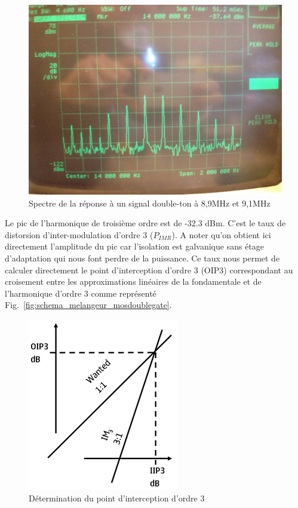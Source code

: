 \documentclass{article}
\begin{document}
\begin{figure}[h!]
	\centering
	\includegraphics[width=.7\textwidth]{9_3_4}
	\caption{Spectre de la réponse à un signal double-ton à 8,9MHz et 9,1MHz}
	\label{fig:9_3_4}
\end{figure}
Le pic de l'harmonique de troisième ordre est de -32.3 dBm. C'est le taux de distorsion d'inter-modulation d'ordre 3 ($P_{IMR}$). A noter qu'on obtient ici directement l'amplitude du pic car l'isolation est galvanique sans étage d'adaptation qui nous font perdre de la puissance.
Ce taux nous permet de calculer directement le point d'interception d'ordre 3 (OIP3) correspondant au croisement entre les approximations linéaires de la fondamentale et de l'harmonique d'ordre 3 comme représenté Fig.~\ref{fig:schema_melangeur_mosdoublegate}.

\begin{figure}[h!]
	\centering
	\includegraphics[width=.7\textwidth]{OIP3}
	\caption{Détermination du point d'interception d'ordre 3}
	\label{fig:OIP3}
\end{figure}
\end{document}
